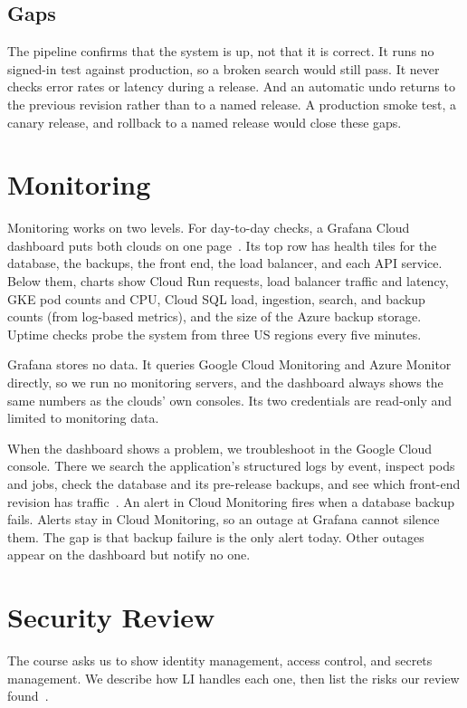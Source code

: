 \documentclass[conference]{IEEEtran}
\begin{document}
\subsection{Gaps}
The pipeline confirms that the system is up, not that it is correct. It
runs no signed-in test against production, so a broken search would still
pass. It never checks error rates or latency during a release. And an
automatic undo returns to the previous revision rather than to a named
release. A production smoke test, a canary release, and rollback to a
named release would close these gaps.

\section{Monitoring}
\label{sec:monitoring}
Monitoring works on two levels. For day-to-day checks, a Grafana Cloud
dashboard puts both clouds on one page~\cite{adr5,dashboard}. Its top row
has health tiles for the database, the backups, the front end, the load
balancer, and each API service. Below them, charts show Cloud Run
requests, load balancer traffic and latency, GKE pod counts and CPU,
Cloud SQL load, ingestion, search, and backup counts (from log-based
metrics), and the size of the Azure backup storage. Uptime checks probe the
system from three US regions every five minutes.

Grafana stores no data. It queries Google Cloud Monitoring and Azure
Monitor directly, so we run no monitoring servers, and the dashboard
always shows the same numbers as the clouds' own consoles. Its two
credentials are read-only and limited to monitoring data.

When the dashboard shows a problem, we troubleshoot in the Google Cloud
console. There we search the application's structured logs by event,
inspect pods and jobs, check the database and its pre-release backups, and
see which front-end revision has traffic~\cite{monrunbook}. An alert in
Cloud Monitoring fires when a database backup fails. Alerts stay in Cloud
Monitoring, so an outage at Grafana cannot silence them. The gap is that
backup failure is the only alert today. Other outages appear on the
dashboard but notify no one.

\section{Security Review}
\label{sec:security}
The course asks us to show identity management, access control, and
secrets management. We describe how LI handles each one, then list the
risks our review found~\cite{secnotes}.
\end{document}
